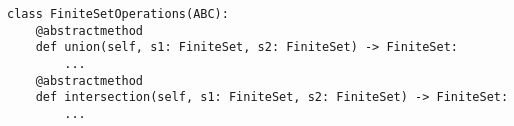 \begin{verbatim}
class FiniteSetOperations(ABC):
    @abstractmethod
    def union(self, s1: FiniteSet, s2: FiniteSet) -> FiniteSet:
        ...
    @abstractmethod
    def intersection(self, s1: FiniteSet, s2: FiniteSet) -> FiniteSet:
        ...
\end{verbatim}